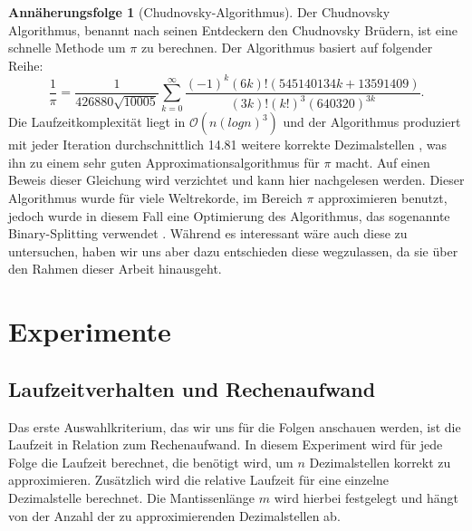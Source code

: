\documentclass{scrartcl}
\theoremstyle{definition}
\newtheorem{approximation sequence}{Annäherungsfolge}
\begin{document}
\begin{approximation sequence}[Chudnovsky-Algorithmus]
Der Chudnovsky Algorithmus, benannt nach seinen Entdeckern den Chudnovsky
Brüdern, ist eine schnelle Methode um \(\pi\) zu berechnen. Der Algorithmus
basiert auf folgender Reihe\cite{Chudnovsky}:
\begin{equation*}
    \frac{1}{\pi}
    = \frac{1}{426880 \sqrt{10005}}
    \sum_{k = 0}^{\infty}
    \frac{(-1)^k(6k)!(545140134k+13591409)}{(3k)!(k!)^3(640320)^{3k}}.
\end{equation*}
Die Laufzeitkomplexität liegt in \(\mathcal{O}(n(logn)^3)\)
\cite{Runtime-Chudnovsky} und der Algorithmus produziert mit jeder Iteration
durchschnittlich 14.81 weitere korrekte Dezimalstellen
\cite{Nachkommastellen-Chudnovsky}, was ihn zu einem sehr guten
Approximationsalgorithmus für \(\pi\) macht. Auf einen Beweis dieser Gleichung
wird verzichtet und kann hier \cite{Chudnovsky-Proof} nachgelesen werden.
Dieser Algorithmus wurde für viele Weltrekorde, im Bereich \(\pi\)
approximieren benutzt, jedoch wurde in diesem Fall eine Optimierung des
Algorithmus, das sogenannte Binary-Splitting verwendet \cite{Chudnovsky}.
Während es interessant wäre auch diese zu untersuchen, haben wir uns aber dazu
entschieden diese wegzulassen, da sie über den Rahmen dieser Arbeit hinausgeht.

\end{approximation sequence}

\pagebreak

\section{Experimente}

\subsection{Laufzeitverhalten und Rechenaufwand}

Das erste Auswahlkriterium, das wir uns für die Folgen anschauen werden, ist
die Laufzeit in Relation zum Rechenaufwand. In diesem Experiment wird für jede
Folge die Laufzeit berechnet, die benötigt wird, um \(n\) Dezimalstellen
korrekt zu approximieren. Zusätzlich wird die relative Laufzeit für eine
einzelne Dezimalstelle berechnet. Die Mantissenlänge \(m\) wird hierbei
festgelegt und hängt von der Anzahl der zu approximierenden Dezimalstellen ab.
\end{document}
